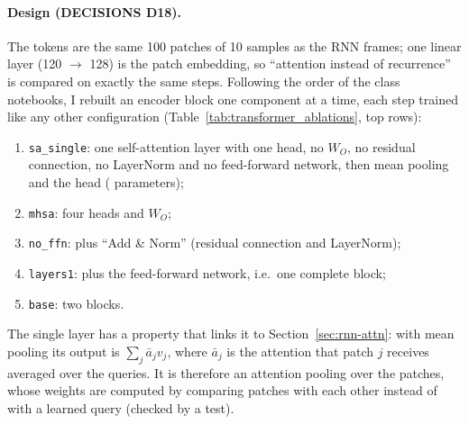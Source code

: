 \paragraph{Design (DECISIONS D18).} The tokens are the same 100 patches of 10 samples as the RNN frames;
one linear layer (120 $\rightarrow$ 128) is the patch embedding, so ``attention instead of recurrence''
is compared on exactly the same steps. Following the order of the class notebooks, I rebuilt an encoder
block one component at a time, each step trained like any other configuration
(Table~\ref{tab:transformer_ablations}, top rows):
\begin{enumerate}[leftmargin=1.4em,itemsep=1pt]
  \item \texttt{sa\_single}: one self-attention layer with one head, no $W_O$, no residual connection,
        no LayerNorm and no feed-forward network, then mean pooling and the head
        (\transformerParamsSaSingle{} parameters);
  \item \texttt{mhsa}: four heads and $W_O$;
  \item \texttt{no\_ffn}: plus ``Add \& Norm'' (residual connection and LayerNorm);
  \item \texttt{layers1}: plus the feed-forward network, i.e.\ one complete block;
  \item \texttt{base}: two blocks.
\end{enumerate}
The single layer has a property that links it to Section~\ref{sec:rnn-attn}: with mean pooling its
output is $\sum_j \bar a_j v_j$, where $\bar a_j$ is the attention that patch $j$ receives averaged over
the queries. It is therefore an attention pooling over the patches, whose weights are computed by
comparing patches with each other instead of with a learned query (checked by a test).

